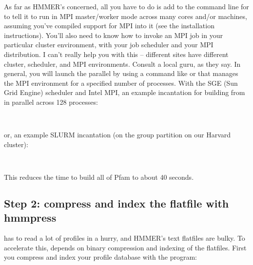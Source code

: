 As far as HMMER's concerned, all you have to do is add 
to the command line for  to tell it to run in MPI
master/worker mode across many cores and/or machines, assuming you've
compiled support for MPI into it (see the installation instructions).
You'll also need to know how to invoke an MPI job in your particular
cluster environment, with your job scheduler and your MPI
distribution. I can't really help you with this -- different sites
have different cluster, scheduler, and MPI environments. Consult a
local guru, as they say. In general, you will launch the parallel
 by using a command like  or 
that manages the MPI environment for a specified number of processes.
With the SGE (Sun Grid Engine) scheduler and Intel MPI, an example
incantation for building  from  in
parallel across 128 processes:

   \vspace{1ex}
   \\
   \vspace{1ex}

or, an example SLURM incantation (on the  group partition
on our Harvard cluster):

   \vspace{1ex}
   \begin{fullwidth}
   \\
   \end{fullwidth}
   \vspace{1em}

This reduces the time to build all of Pfam to about 40 seconds.



\subsection{Step 2: compress and index the flatfile with hmmpress}

 has to read a lot of profiles in a hurry, and
HMMER's text flatfiles are bulky. To accelerate this, 
depends on binary compression and indexing of the flatfiles.  First
you compress and index your profile database with the 
program:

